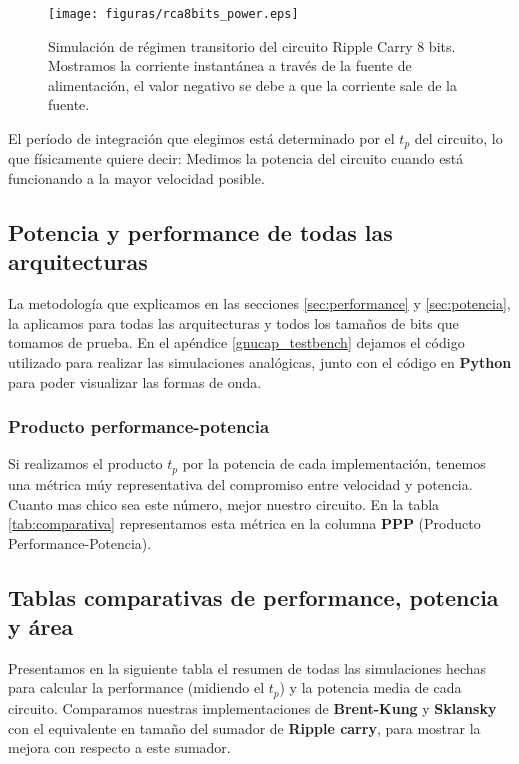 \begin{figure}
  \centering
\texttt{[image: figuras/rca8bits\_power.eps]}
  \caption{Simulación de régimen transitorio del circuito Ripple Carry 8 bits. Mostramos la corriente instantánea a través de la fuente de alimentación, el valor negativo se debe a que la corriente sale de la fuente. }
\label{fig:sim_rca8_pow}
\end{figure}
El período de integración que elegimos está determinado por el $t_p$ del circuito, lo que físicamente quiere decir: Medimos la potencia del circuito cuando está funcionando a la mayor velocidad posible. 

\subsection{Potencia y performance de todas las arquitecturas}
La metodología que explicamos en las secciones \ref{sec:performance} y \ref{sec:potencia}, la aplicamos para todas las arquitecturas y todos los tamaños de bits que tomamos de prueba. En el apéndice \ref{gnucap_testbench} dejamos el código utilizado para realizar las simulaciones analógicas, junto con el código en \textbf{Python} para poder visualizar las formas de onda.
\subsubsection{Producto performance-potencia}
Si realizamos el producto $t_p$ por la potencia de cada implementación, tenemos una métrica múy representativa del compromiso entre velocidad y potencia. Cuanto mas chico sea este número, mejor nuestro circuito. En la tabla \ref{tab:comparativa} representamos esta métrica en la columna \textbf{PPP} (Producto Performance-Potencia).

\subsection{Tablas comparativas de
 performance, potencia y área}
	
Presentamos en la siguiente tabla el resumen de todas las simulaciones hechas para calcular la performance (midiendo el $t_p$) y la potencia media de cada circuito. Comparamos nuestras implementaciones de \textbf{Brent-Kung} y \textbf{Sklansky} con el equivalente en tamaño del sumador de \textbf{Ripple carry}, para mostrar la mejora con respecto a este sumador.


